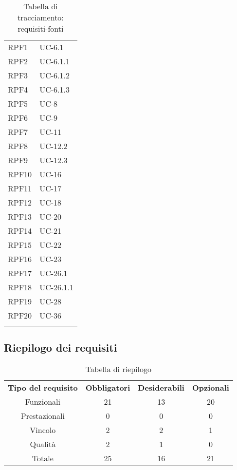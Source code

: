 \begin{longtable}{| p{5cm} | p{5cm} |}
		\rowcolor{LightGray}
		RPF1 & UC-6.1\\
		RPF2 & UC-6.1.1\\
		\rowcolor{LightGray}
		RPF3 & UC-6.1.2\\
		RPF4 & UC-6.1.3\\
		\rowcolor{LightGray}
		RPF5 & UC-8\\
		RPF6 & UC-9\\
		\rowcolor{LightGray}
		RPF7 & UC-11\\
		RPF8 & UC-12.2\\
		\rowcolor{LightGray}
		RPF9 & UC-12.3\\
		RPF10 & UC-16\\
		\rowcolor{LightGray}
		RPF11 & UC-17\\
		RPF12 & UC-18\\
		\rowcolor{LightGray}
		RPF13 & UC-20\\
		RPF14 & UC-21\\
		\rowcolor{LightGray}
		RPF15 & UC-22\\
		RPF16 & UC-23\\
		\rowcolor{LightGray}
		RPF17 & UC-26.1\\
		RPF18 & UC-26.1.1\\
		\rowcolor{LightGray}
		RPF19 & UC-28\\
		RPF20 & UC-36\\
		\rowcolor{LightGray}		
		\hline
		\caption{Tabella di tracciamento: requisiti-fonti}
\end{longtable}

\subsection{Riepilogo dei requisiti}
\begin{table}[h]
\centering
\begin{tabular}{| c | c | c | c |}
		\rowcolor{LightBlue}
		\color{white}\bfseries Tipo del requisito & \color{white}\bfseries Obbligatori & \color{white}\bfseries Desiderabili & \color{white}\bfseries Opzionali \\[0.25cm]
		 Funzionali & 21 & 13 & 20 \\
		 Prestazionali & 0 & 0 & 0 \\
		 Vincolo & 2 & 2 & 1 \\
		 Qualità & 2 & 1 & 0 \\
		 Totale & 25 & 16 & 21 \\ \hline
\end{tabular}
		\caption{Tabella di riepilogo}
\end{table}


\newpage